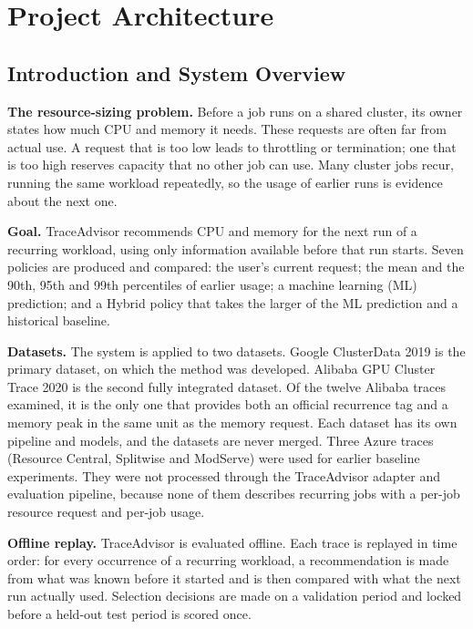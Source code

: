 \section{Project Architecture}\label{sec:2}

\subsection{Introduction and System Overview}\label{sec:2.1}

\textbf{The resource-sizing problem.} Before a job runs on a shared cluster, its owner states how much CPU and memory it needs. These requests are often far from actual use. A request that is too low leads to throttling or termination; one that is too high reserves capacity that no other job can use. Many cluster jobs recur, running the same workload repeatedly, so the usage of earlier runs is evidence about the next one.

\textbf{Goal.} TraceAdvisor recommends CPU and memory for the next run of a recurring workload, using only information available before that run starts. Seven policies are produced and compared: the user's current request; the mean and the 90th, 95th and 99th percentiles of earlier usage; a machine learning (ML) prediction; and a Hybrid policy that takes the larger of the ML prediction and a historical baseline.

\textbf{Datasets.} The system is applied to two datasets. Google ClusterData 2019 is the primary dataset, on which the method was developed. Alibaba GPU Cluster Trace 2020 is the second fully integrated dataset. Of the twelve Alibaba traces examined, it is the only one that provides both an official recurrence tag and a memory peak in the same unit as the memory request. Each dataset has its own pipeline and models, and the datasets are never merged. Three Azure traces (Resource Central, Splitwise and ModServe) were used for earlier baseline experiments. They were not processed through the TraceAdvisor adapter and evaluation pipeline, because none of them describes recurring jobs with a per-job resource request and per-job usage.

\textbf{Offline replay.} TraceAdvisor is evaluated offline. Each trace is replayed in time order: for every occurrence of a recurring workload, a recommendation is made from what was known before it started and is then compared with what the next run actually used. Selection decisions are made on a validation period and locked before a held-out test period is scored once.

